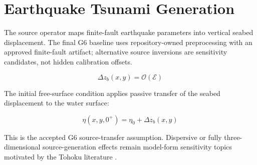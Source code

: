 \section{Earthquake Tsunami Generation}

The source operator maps finite-fault earthquake parameters into vertical seabed displacement. The final G6 baseline uses repository-owned preprocessing with an approved finite-fault artifact; alternative source inversions are sensitivity candidates, not hidden calibration offsets.

\begin{equation}
\label{eq:earthquake-displacement-operator}
\Delta z_b(x,y)=\mathcal O(\mathcal E)
\end{equation}

The initial free-surface condition applies passive transfer of the seabed displacement to the water surface:

\begin{equation}
\label{eq:passive-free-surface-transfer}
\eta(x,y,0^+)=\eta_0+\Delta z_b(x,y)
\end{equation}

This is the accepted G6 source-transfer assumption. Dispersive or fully three-dimensional source-generation effects remain model-form sensitivity topics motivated by the Tohoku literature \autocite{saito2014dispersion,baba2017farfield}.
